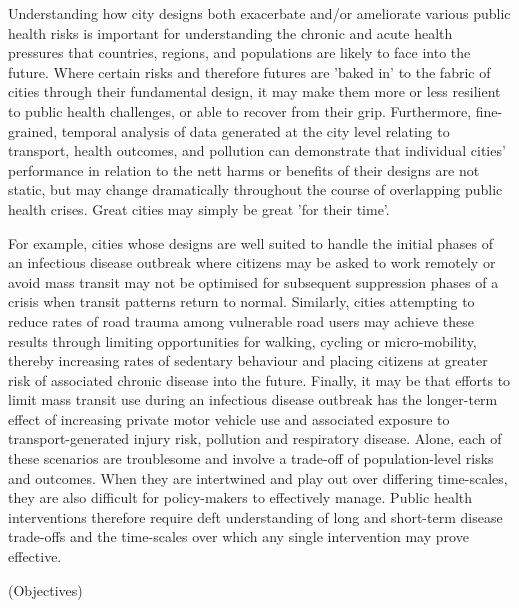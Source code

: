 \documentclass[preprint,12pt]{elsarticle}
\begin{document}
Understanding how city designs both exacerbate and/or ameliorate various public health risks is important for understanding the chronic and acute health pressures that countries, regions, and populations are likely to face into the future. Where certain risks and therefore futures are 'baked in' to the fabric of cities through their fundamental design, it may make them more or less resilient to public health challenges, or able to recover from their grip. Furthermore, fine-grained, temporal analysis of data generated at the city level relating to transport, health outcomes, and pollution can demonstrate that individual cities' performance in relation to the nett harms or benefits of their designs are not static, but may change dramatically throughout the course of overlapping public health crises. Great cities may simply be great 'for their time'. 

For example, cities whose designs are well suited to handle the initial phases of an infectious disease outbreak where citizens may be asked to work remotely or avoid mass transit may not be optimised for subsequent suppression phases of a crisis when transit patterns return to normal. Similarly, cities attempting to reduce rates of road trauma among vulnerable road users may achieve these results through limiting opportunities for walking, cycling or micro-mobility, thereby increasing rates of sedentary behaviour and placing citizens at greater risk of associated chronic disease into the future. Finally, it may be that efforts to limit mass transit use during an infectious disease outbreak has the longer-term effect of increasing private motor vehicle use and associated exposure to transport-generated injury risk, pollution and respiratory disease. Alone, each of these scenarios are troublesome and involve a trade-off of population-level risks and outcomes. When they are intertwined and play out over differing time-scales, they are also difficult for policy-makers to effectively manage. Public health interventions therefore require deft understanding of long and short-term disease trade-offs and the time-scales over which any single intervention may prove effective.


(Objectives)
\end{document}
